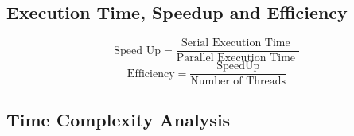 \documentclass{article}
\newcommand{\cpp}{\lstinline[language=C++]}
\begin{document}
    \subsection{Execution Time, Speedup and Efficiency}
    
    $$\text{Speed Up}=\frac{\text{Serial Execution Time }}{\text{Parallel Execution Time }}$$
    $$\text{Efficiency}=\frac{\text{SpeedUp}}{\text{Number of Threads}}$$
    
    
    \subsection{Time Complexity Analysis}
    
        
    
\end{document}
